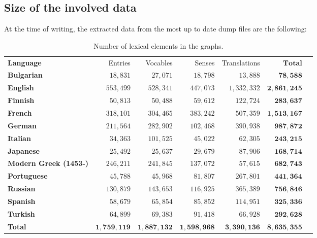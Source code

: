 \documentclass[10pt, a4paper]{article}
\begin{document}
\subsection{Size of the involved data}

At the time of writing, the extracted data from the most up to date dump files are the following:

\begin{table}[htb]
\begin{minipage}{\linewidth}
\begin{small}
\begin{tabular}{lrrrrrr}
\hline
\textbf{Language} & Entries & Vocables & Senses & Translations & $\mathbf{Total}$ \\
\textbf{Bulgarian} & $18,831$ & $27,071$ & $18,798$ & $13,888$ & $\mathbf{78,588}$ \\
\textbf{English} & $553,499$ & $528,341$ & $447,073$ & $1,332,332$ & $\mathbf{2,861,245}$ \\
\textbf{Finnish} & $50,813$ & $50,488$ & $59,612$ & $122,724$ & $\mathbf{283,637}$ \\
\textbf{French} & $318,101$ & $304,465$ & $383,242$ & $507,359$ & $\mathbf{1,513,167}$ \\
\textbf{German} & $211,564$ & $282,902$ & $102,468$ & $390,938$ & $\mathbf{987,872}$ \\
\textbf{Italian} & $34,363$ & $101,525$ & $45,022$ & $62,305$ & $\mathbf{243,215}$ \\
\textbf{Japanese} & $25,492$ & $25,637$ & $29,679$ & $87,906$ & $\mathbf{168,714}$ \\
\textbf{Modern Greek (1453-)} & $246,211$ & $241,845$ & $137,072$ & $57,615$ & $\mathbf{682,743}$ \\
\textbf{Portuguese} & $45,788$ & $45,968$ & $81,807$ & $267,801$ & $\mathbf{441,364}$ \\
\textbf{Russian} & $130,879$ & $143,653$ & $116,925$ & $365,389$ & $\mathbf{756,846}$ \\
\textbf{Spanish} & $58,679$ & $65,854$ & $85,852$ & $114,951$ & $\mathbf{325,336}$ \\
\textbf{Turkish} & $64,899$ & $69,383$ & $91,418$ & $66,928$ & $\mathbf{292,628}$ \\
\textbf{Total} & $\mathbf{1,759,119}$ & $\mathbf{1,887,132}$ & $\mathbf{1,598,968}$ & $\mathbf{3,390,136}$ & $\mathbf{8,635,355}$ \\
\end{tabular}
\end{small}
\end{minipage}
\caption{Number of lexical elements in the graphs.}
\label{table:size}
\end{table}
\end{document}
